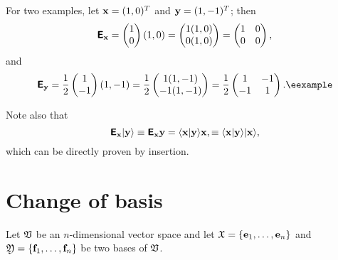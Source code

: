 {
\color{blue}
\bexample
For two examples, let
${\bf x}=(1,0)^T$
and
${\bf y}=(1,-1)^T$;
then
$$
\textsf{\textbf{E}}_{\bf x}
=
\begin{pmatrix}
1\\
0
\end{pmatrix}
(1,0)
=
\begin{pmatrix}
1(1,0)\\
0(1,0)
\end{pmatrix}
=
\begin{pmatrix}
1&0\\
0&0
\end{pmatrix}
,
$$
and
$$
\textsf{\textbf{E}}_{\bf y}
= \frac{1}{2}
\begin{pmatrix}
1\\
-1
\end{pmatrix}
(1,-1)
= \frac{1}{2}
\begin{pmatrix}
1(1,-1)\\
-1(1,-1)
\end{pmatrix}
= \frac{1}{2}
\begin{pmatrix}
1&-1\\
-1&1
\end{pmatrix}
.
\textrm{\eexample}
$$
}

Note also that
\begin{equation}
\textsf{\textbf{E}}_{\bf x} \vert {\bf y}\rangle
\equiv
\textsf{\textbf{E}}_{\bf x} {\bf y}
=
\langle {\bf x}\vert  {\bf y} \rangle {\bf x},
\equiv
\langle {\bf x}\vert  {\bf y} \rangle \vert {\bf x}\rangle ,
\end{equation}
which can be directly proven by insertion.





\section{Change of basis}
\label{2012-m-ch-fdlvs-changeofbasis}

Let ${\frak V}$ be an $n$-dimensional vector space and let
${\frak X}
=
\{
{\bf e}_1,
\ldots ,
{\bf e}_n
\}$
and
${\frak Y}
=  \{
{\bf f}_1,
\ldots ,
{\bf f}_n
\}$ be two bases of ${\frak V}$.

